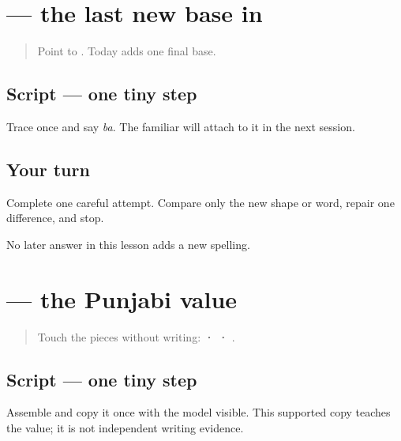 \section[\texorpdfstring{\pa{ਬ} (ba)}{ਬ (ba)}]{ — the last new base in }

\label{lesson:PA-W03-ba}



\begin{quote}
Point to \textbf{}. Today adds one final base.
\end{quote}

\subsection*{Script — one tiny step}

Trace \textbf{} once and say \emph{ba}. The familiar \textbf{} will attach to it in the next session.

\subsection*{Your turn}
Complete one careful attempt. Compare only the new shape or word, repair one difference, and stop.

\begin{tcolorbox}[breakable,colback=teal!4,colframe=teal!35!black,title={Before you move on}]
No later answer in this lesson adds a new spelling.
\end{tcolorbox}
\section[\texorpdfstring{\pa{ਪੰਜਾਬੀ} (panjābī)}{ਪੰਜਾਬੀ (panjābī)}]{ — the Punjabi value}

\label{lesson:PA-W03-punjabi}



\begin{quote}
Touch the pieces without writing: \textbf{ ·  · }.
\end{quote}

\subsection*{Script — one tiny step}
Assemble \textbf{} and copy it once with the model visible. This supported copy teaches the value; it is not independent writing evidence.

